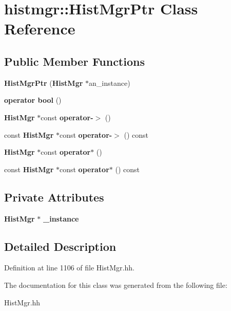 \section{histmgr::HistMgrPtr Class Reference}
\label{classhistmgr_1_1HistMgrPtr}
\subsection*{Public Member Functions}
\begin{DoxyCompactItemize}
\item 
{\bfseries HistMgrPtr} ({\bf HistMgr} $\ast$an\_\-instance)\label{classhistmgr_1_1HistMgrPtr_ae479940d9c35efe726945038b4919a21}

\item 
{\bfseries operator bool} ()\label{classhistmgr_1_1HistMgrPtr_acf2158fc8e0f347d006fc31f1a33bf52}

\item 
{\bf HistMgr} $\ast$const {\bfseries operator-\/$>$} ()\label{classhistmgr_1_1HistMgrPtr_a09dd0e1b7852437c12f7fe251ff713dc}

\item 
const {\bf HistMgr} $\ast$const {\bfseries operator-\/$>$} () const \label{classhistmgr_1_1HistMgrPtr_ac497929db7588d7629cd2c3bf7e9744c}

\item 
{\bf HistMgr} $\ast$const {\bfseries operator$\ast$} ()\label{classhistmgr_1_1HistMgrPtr_a074898ab82b8aea3c938331ffd635939}

\item 
const {\bf HistMgr} $\ast$const {\bfseries operator$\ast$} () const \label{classhistmgr_1_1HistMgrPtr_ad0f7b4a29768b1773ec06230b848a02a}

\end{DoxyCompactItemize}
\subsection*{Private Attributes}
\begin{DoxyCompactItemize}
\item 
{\bf HistMgr} $\ast$ {\bfseries \_\-instance}\label{classhistmgr_1_1HistMgrPtr_a7ef0be62561702faa6a28628f008b9fe}

\end{DoxyCompactItemize}


\subsection{Detailed Description}


Definition at line 1106 of file HistMgr.hh.

The documentation for this class was generated from the following file:\begin{DoxyCompactItemize}
\item 
HistMgr.hh\end{DoxyCompactItemize}
